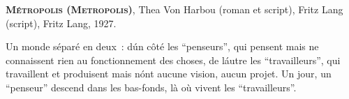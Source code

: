 \begin{thebibliography}{1}
  \textsc{\textbf{Métropolis (Metropolis)}},
  Thea Von Harbou (roman et script), Fritz Lang (script), Fritz Lang,
  1927.\newline
  {\advance\baselineskip -3pt {\scriptsize Un monde séparé en deux~: d\'un côté les “penseurs”, qui pensent mais ne connaissent rien au fonctionnement des choses, de l\'autre les “travailleurs”, qui travaillent et produisent mais n\'ont aucune vision, aucun projet. Un jour, un “penseur” descend dans les bas-fonds, là où vivent les “travailleurs”.} \par}\newline
  \backref
\end{thebibliography}